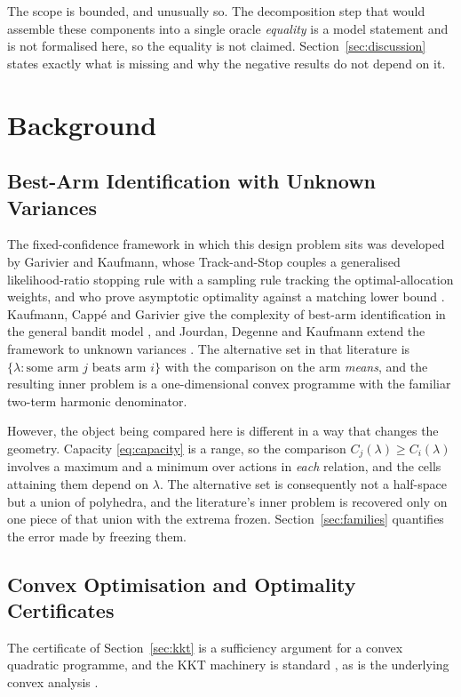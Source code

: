 \documentclass[conference]{IEEEtran}
\theoremstyle{definition}
\begin{document}
The scope is bounded, and unusually so. The decomposition step that would assemble these
components into a single oracle \emph{equality} is a model statement and is not formalised
here, so the equality is not claimed. Section~\ref{sec:discussion} states exactly what is
missing and why the negative results do not depend on it.

\section{Background}

\subsection{Best-Arm Identification with Unknown Variances}

The fixed-confidence framework in which this design problem sits was developed by Garivier
and Kaufmann, whose Track-and-Stop couples a generalised likelihood-ratio stopping rule with
a sampling rule tracking the optimal-allocation weights, and who prove asymptotic optimality
against a matching lower bound \cite{garivier2016}. Kaufmann, Capp\'e and Garivier give the
complexity of best-arm identification in the general bandit model \cite{kaufmann2016}, and
Jourdan, Degenne and Kaufmann extend the framework to unknown variances \cite{jourdan2023}.
The alternative set in that literature is $\{\lambda:\text{some arm }j\text{ beats arm }i\}$
with the comparison on the arm \emph{means}, and the resulting inner problem is a
one-dimensional convex programme with the familiar two-term harmonic denominator.

However, the object being compared here is different in a way that changes the geometry.
Capacity \eqref{eq:capacity} is a range, so the comparison $C_{j}(\lambda)\ge C_{i}(\lambda)$
involves a maximum and a minimum over actions in \emph{each} relation, and the cells
attaining them depend on $\lambda$. The alternative set is consequently not a half-space but
a union of polyhedra, and the literature's inner problem is recovered only on one piece of
that union with the extrema frozen. Section~\ref{sec:families} quantifies the error made by
freezing them.

\subsection{Convex Optimisation and Optimality Certificates}

The certificate of Section~\ref{sec:kkt} is a sufficiency argument for a convex quadratic
programme, and the KKT machinery is standard \cite{boyd2004}, as is the underlying convex
analysis \cite{rockafellar1970}.
\end{document}
